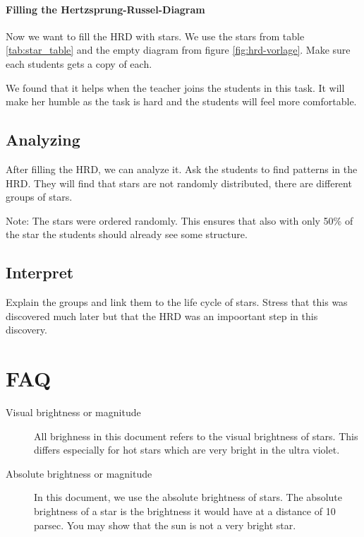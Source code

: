 \documentclass[a4paper]{article}
\begin{document}
    \paragraph*{Filling the Hertzsprung-Russel-Diagram}

    Now we want to fill the HRD with stars.
    We use the stars from table \ref{tab:star_table} and the empty diagram from figure \ref{fig:hrd-vorlage}.
    Make sure each students gets a copy of each.
    
    We found that it helps when the teacher joins the students in this task.
    It will make her humble as the task is hard and the students will feel more comfortable.

    \subsection*{Analyzing}

    After filling the HRD, we can analyze it.
    Ask the students to find patterns in the HRD.
    They will find that stars are not randomly distributed, there are different groups of stars.
    
    Note: The stars were ordered randomly. This ensures that also with only 50\% of the star the students should already see some structure.
    
    \subsection*{Interpret}

    Explain the groups and link them to the life cycle of stars.
    Stress that this was discovered much later but that the HRD was an impoortant step in this discovery.

    \section{FAQ}
    \label{sec:faq}

    \begin{description}
        \item[Visual brightness or magnitude]
            All brighness in this document refers to the visual brightness of stars.
            This differs especially for hot stars which are very bright in the ultra violet.
        \item[Absolute brightness or magnitude]
            In this document, we use the absolute brightness of stars.
            The absolute brightness of a star is the brightness it would have at a distance of 10 parsec.
            You may show that the sun is not a very bright star.
    \end{description}
\end{document}
